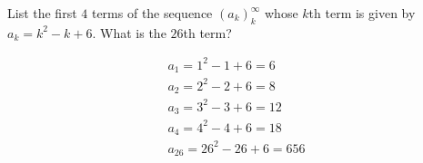 \begin{example}
    List the first \(4\) terms of the sequence \(\left(a_{k}\right)_{k}^{\infty}\) whose \(k\)th term is given by \(a_k = k^2-k+6.\) What is the \(26\)th term?
    \begin{solution}
        \begin{gather*}
            a_1 = 1^2 - 1 + 6 = 6 \\
            a_2 = 2^2 - 2 + 6 = 8 \\
            a_3 = 3^2 - 3 + 6 = 12 \\
            a_4 = 4^2 - 4 + 6 = 18 \\
            a_26 = 26^2 - 26 + 6 = 656
        \end{gather*}
    \end{solution}
\end{example}
